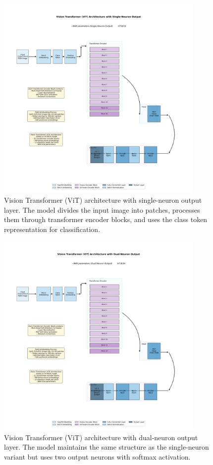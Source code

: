 \begin{figure}[!htbp]
\centering
\includegraphics[width=0.9\textwidth]{figures/vit_1neuron_architecture.png}
\caption{Vision Transformer (ViT) architecture with single-neuron output layer. The model divides the input image into patches, processes them through transformer encoder blocks, and uses the class token representation for classification.}
\label{fig:vit_arch_single}
\end{figure}

\begin{figure}[!htbp]
\centering
\includegraphics[width=0.9\textwidth]{figures/vit_2neuron_architecture.png}
\caption{Vision Transformer (ViT) architecture with dual-neuron output layer. The model maintains the same structure as the single-neuron variant but uses two output neurons with softmax activation.}
\label{fig:vit_arch_dual}
\end{figure}

